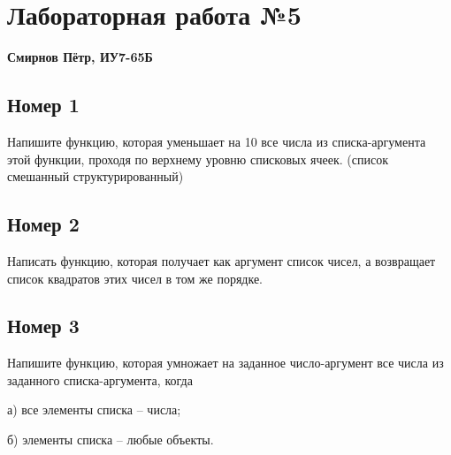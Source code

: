 \chapter{Лабораторная работа №5}

\textbf{Смирнов Пётр, ИУ7-65Б}

\section{Номер 1}

Напишите функцию, которая уменьшает на 10 все числа из списка-аргумента этой
функции, проходя по верхнему уровню списковых ячеек. (список смешанный 
структурированный)

\begin{figure}[H]
    \begin{listingbox}{}
        
    \end{listingbox}
    \label{lst:1}
\end{figure}

\section{Номер 2}

Написать функцию, которая получает как аргумент список чисел, а возвращает
список квадратов этих чисел в том же порядке.

\begin{figure}[H]
    \begin{listingbox}{}
        
    \end{listingbox}
    \label{lst:2}
\end{figure}

\section{Номер 3}

Напишите функцию, которая умножает на заданное число-аргумент все числа из
заданного списка-аргумента, когда 

а) все элементы списка -- числа;

б) элементы списка -- любые объекты.

\begin{figure}[H]
    \begin{listingbox}{}
        
    \end{listingbox}
    \label{lst:3}
\end{figure}

